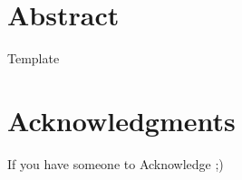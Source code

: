 

\chapter*{Abstract}
Template

\chapter*{Acknowledgments}
If you have someone to Acknowledge ;)

\tableofcontents

